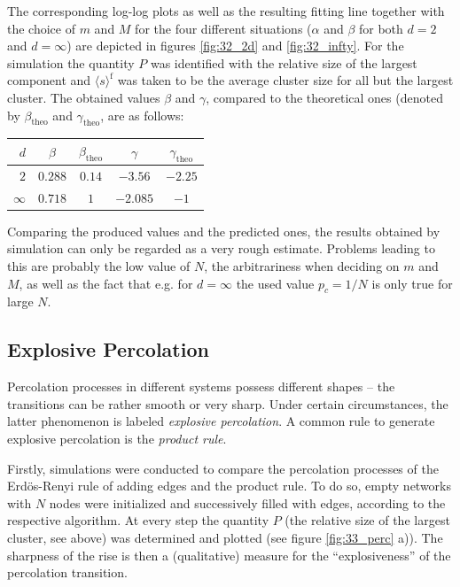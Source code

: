 \documentclass{scrartcl}
\begin{document}
The corresponding log-log plots as well as the resulting fitting line
together with the choice of $m$ and $M$ for the four different situations
($\alpha$ and $\beta$ for both $d=2$ and $d=\infty$) are depicted in
figures \ref{fig:32_2d} and \ref{fig:32_infty}. For the simulation the
quantity $P$ was identified with the relative size of the largest component
and $\langle s\rangle^\mathrm{f}$ was taken to be the average cluster size
for all but the largest cluster. The obtained values $\beta$ and $\gamma$,
compared to the theoretical ones (denoted by $\beta_\mathrm{theo}$ and
$\gamma_\mathrm{theo}$, are as follows:

\begin{center}
    \begin{tabular}{r@{\qquad\qquad}c@{\quad}c@{\qquad\quad}c@{\quad}c}
    $d$ & $\beta$ & $\beta_\mathrm{theo}$ & $\gamma$ & $\gamma_\mathrm{theo}$ \\
    \hline
    $2$ & $0.288$ & $0.14$ & $-3.56$ & $-2.25$   \\
    $\infty$ & $0.718$ & $1$ & $-2.085$ & $-1$ \\
\end{tabular}
\end{center}

Comparing the produced values and the predicted ones, the results obtained
by simulation can only be regarded as a very rough estimate. Problems
leading to this are probably the low value of $N$, the arbitrariness when
deciding on $m$ and $M$, as well as the fact that e.g. for $d=\infty$ the used
value $p_c=1/N$ is only true for large $N$.


\subsection{Explosive Percolation}
Percolation processes in different systems possess different shapes -- the
transitions can be rather smooth or very sharp. Under certain
circumstances, the latter phenomenon is labeled \emph{explosive
percolation}. A common rule to generate explosive percolation
is the \emph{product rule}.

 Firstly, simulations were conducted to compare the
percolation processes of the Erdös-Renyi rule of adding edges and the
product rule. To do so, empty networks with $N$ nodes were initialized and
successively filled with edges, according to the respective algorithm. At
every step the quantity $P$ (the relative size of the largest cluster, see
above) was determined and plotted (see figure \ref{fig:33_perc} a)). The
sharpness of the rise is then a (qualitative) measure for the
\enquote{explosiveness} of the percolation transition.
\end{document}
